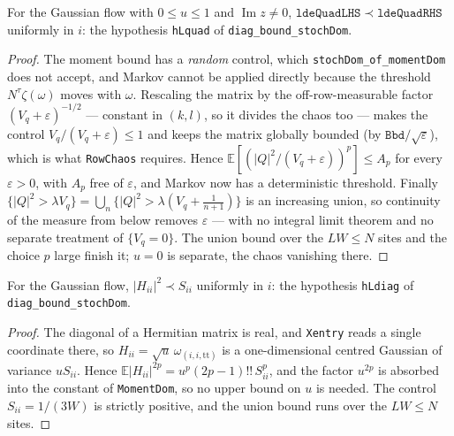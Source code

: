 \begin{lemma}\label{lem:lde-quad-dom}
  \leanok{}
  For the Gaussian flow with $0\le u\le1$ and $\operatorname{Im}z\ne0$,
  $\mathtt{ldeQuadLHS}\prec\mathtt{ldeQuadRHS}$ uniformly in $i$: the hypothesis
  \texttt{hLquad} of \texttt{diag\_bound\_stochDom}.
\end{lemma}
\begin{proof}\leanok
  The moment bound has a \emph{random} control, which \texttt{stochDom\_of\_momentDom} does not
  accept, and Markov cannot be applied directly because the threshold $N^\tau\zeta(\omega)$ moves
  with $\omega$.  Rescaling the matrix by the off-row-measurable factor $(V_q+\varepsilon)^{-1/2}$
  --- constant in $(k,l)$, so it divides the chaos too --- makes the control $V_q/(V_q+\varepsilon)
  \le1$ and keeps the matrix globally bounded (by $\mathtt{Bbd}/\sqrt\varepsilon$), which is what
  \texttt{RowChaos} requires.  Hence
  $\mathbb E[(|Q|^2/(V_q+\varepsilon))^{p}]\le A_{p}$ for every $\varepsilon>0$, with $A_p$ free of
  $\varepsilon$, and Markov now has a deterministic threshold.  Finally
  $\{|Q|^2>\lambda V_q\}=\bigcup_n\{|Q|^2>\lambda(V_q+\tfrac1{n+1})\}$ is an increasing union, so
  continuity of the measure from below removes $\varepsilon$ --- with no integral limit theorem and
  no separate treatment of $\{V_q=0\}$.  The union bound over the $LW\le N$ sites and the choice
  $p$ large finish it; $u=0$ is separate, the chaos vanishing there.
\end{proof}

\begin{lemma}\label{lem:lde-diag}
  \leanok{}
  For the Gaussian flow, $|H_{ii}|^2\prec S_{ii}$ uniformly in $i$: the hypothesis
  \texttt{hLdiag} of \texttt{diag\_bound\_stochDom}.
\end{lemma}
\begin{proof}\leanok
  The diagonal of a Hermitian matrix is real, and \texttt{Xentry} reads a single coordinate
  there, so $H_{ii}=\sqrt u\,\omega_{(i,i,\mathrm{tt})}$ is a one-dimensional centred Gaussian of
  variance $u S_{ii}$.  Hence $\mathbb E|H_{ii}|^{2p}=u^p(2p-1)!!\,S_{ii}^p$, and the factor
  $u^{2p}$ is absorbed into the constant of \texttt{MomentDom}, so no upper bound on $u$ is
  needed.  The control $S_{ii}=1/(3W)$ is strictly positive, and the union bound runs over the
  $LW\le N$ sites.
\end{proof}

